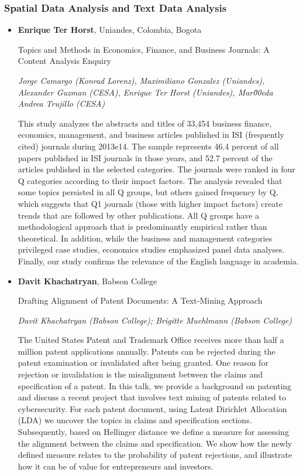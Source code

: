 \subsubsection*{Spatial Data Analysis and Text Data Analysis}

\begin{itemize}
\item \textbf{Enrique Ter Horst}, Uniandes, Colombia, Bogota

Topics and Methods in Economics, Finance, and Business Journals: A Content Analysis Enquiry

\emph{\footnotesize Jorge Camargo (Konrad Lorenz), Maximiliano Gonzalez (Uniandes), Alexander Guzman (CESA), Enrique Ter Horst (Uniandes), Mar\u00eda Andrea Trujillo (CESA)}

This study analyzes the abstracts and titles of 33,454 business finance, economics, management, and business articles published in ISI (frequently cited) journals during 2013e14. The sample represents 46.4 percent of all papers published in ISI journals in those years, and 52.7 percent of the articles published in the selected categories. The journals were ranked in four Q categories according to their impact factors. The analysis revealed that some topics persisted in all Q groups, but others gained frequency by Q, which suggests that Q1 journals (those with higher impact factors) create trends that are followed by other publications. All Q groups have a methodological approach that is predominantly empirical rather than theoretical. In addition, while the business and management categories privileged case studies, economics studies emphasized panel data analyses. Finally, our study confirms the relevance of the English language in academia.

\item \textbf{Davit Khachatryan}, Babson College

Drafting Alignment of Patent Documents: A Text-Mining Approach

\emph{\footnotesize Davit Khachatryan (Babson College); Brigitte Muehlmann (Babson College)}

The United States Patent and Trademark Office receives more than half a million patent applications annually. Patents can be rejected during the patent examination or invalidated after being granted. One reason for rejection or invalidation is the misalignment between the claims and specification of a patent. In this talk, we provide a background on patenting and discuss a recent project that involves text mining of patents related to cybersecurity. For each patent document, using Latent Dirichlet Allocation (LDA) we uncover the topics in claims and specification sections. Subsequently, based on Hellinger distance we define a measure for assessing the alignment between the claims and specification. We show how the newly defined measure relates to the probability of patent rejections, and illustrate how it can be of value for entrepreneurs and investors.


\end{itemize}
